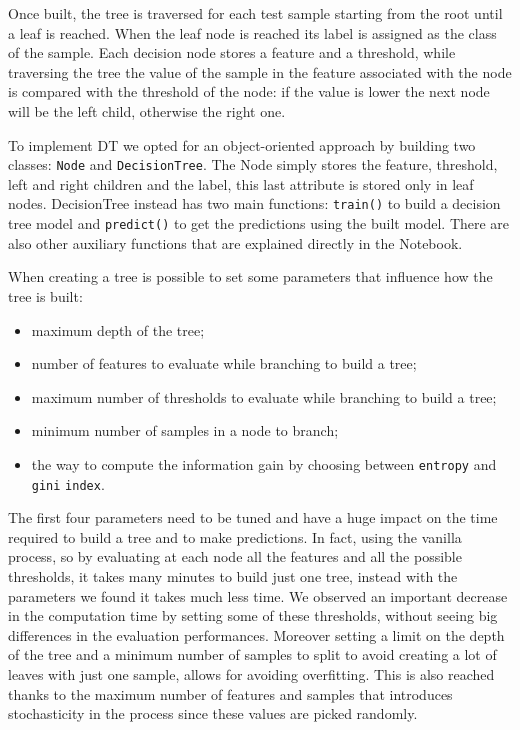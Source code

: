 \documentclass{Configuration_Files/PoliMi3i_thesis}
\begin{document}
Once built, the tree is traversed for each test sample starting from the root until a leaf is reached. When the leaf node is reached its label is assigned as the class of the sample. Each decision node stores a feature and a threshold, while traversing the tree the value of the sample in the feature associated with the node is compared with the threshold of the node: if the value is lower the next node will be the left child, otherwise the right one.

To implement DT we opted for an object-oriented approach by building two classes: \verb|Node| and \verb|DecisionTree|. The Node simply stores the feature, threshold, left and right children and the label, this last attribute is stored only in leaf nodes. DecisionTree instead has two main functions: \verb|train()| to build a decision tree model and \verb|predict()| to get the predictions using the built model. There are also other auxiliary functions that are explained directly in the Notebook.

When creating a tree is possible to set some parameters that influence how the tree is built:
\begin{itemize}
    \item maximum depth of the tree;
    \item number of features to evaluate while branching to build a tree;
    \item maximum number of thresholds to evaluate while branching to build a tree;
    \item minimum number of samples in a node to branch;
    \item the way to compute the information gain by choosing between \verb|entropy| and \verb|gini| \verb|index|.
\end{itemize}

The first four parameters need to be tuned and have a huge impact on the time required to build a tree and to make predictions. In fact, using the vanilla process, so by evaluating at each node all the features and all the possible thresholds, it takes many minutes to build just one tree, instead with the parameters we found it takes much less time. We observed an important decrease in the computation time by setting some of these thresholds, without seeing big differences in the evaluation performances. Moreover setting a limit on the depth of the tree and a minimum number of samples to split to avoid creating a lot of leaves with just one sample, allows for avoiding overfitting. This is also reached thanks to the maximum number of features and samples that introduces stochasticity in the process since these values are picked randomly.
\end{document}

